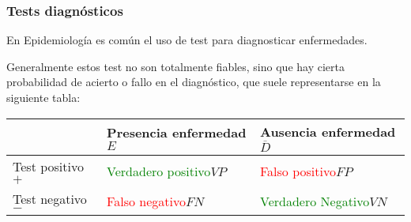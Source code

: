 \begin{frame}
\frametitle{Tests diagnósticos}
En Epidemiología es común el uso de test para diagnosticar enfermedades.

Generalmente estos test no son totalmente fiables, sino que hay cierta probabilidad de acierto o fallo en el diagnóstico, que suele
representarse en la siguiente tabla:
\begin{center}
	\begin{tabular}{|m{2.5cm}|m{3cm}<{\centering}|m{3.1cm}<{\centering}|}
		\cline{2-3}
		\multicolumn{1}{c|}{} & Presencia enfermedad $E$ & Ausencia enfermedad $\overline D$\\ \hline
		Test positivo $+$ & \textcolor{green}{Verdadero positivo}\newline $VP$ & \textcolor{red}{Falso positivo}\newline $FP$\\ \hline Test negativo $-$ & \textcolor{red}{Falso negativo}\newline $FN$ &
		\textcolor{green}{Verdadero Negativo}\newline $VN$\\ \hline
	\end{tabular}
\end{center}

\end{frame}


